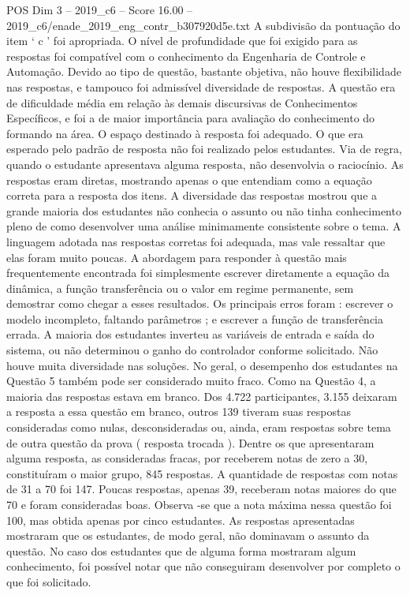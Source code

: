 \begin{textsample}{POS Dim 3 – 2019\_c6 – Score 16.00 – 2019\_c6/enade\_2019\_eng\_contr\_b307920d5e.txt}
A subdivisão da pontuação do item ‘ c ’ foi apropriada.
O nível de profundidade que foi exigido para as respostas foi compatível com o conhecimento da Engenharia de Controle e Automação.
Devido ao tipo de questão, bastante objetiva, não houve flexibilidade nas respostas, e tampouco foi admissível diversidade de respostas.
A questão era de dificuldade média em relação às demais discursivas de Conhecimentos Específicos, e foi a de maior importância para avaliação do conhecimento do formando na área.
O espaço destinado à resposta foi adequado.
O que era esperado pelo padrão de resposta não foi realizado pelos estudantes.
Via de regra, quando o estudante apresentava alguma resposta, não desenvolvia o raciocínio.
As respostas eram diretas, mostrando apenas o que entendiam como a equação correta para a resposta dos itens.
A diversidade das respostas mostrou que a grande maioria dos estudantes não conhecia o assunto ou não tinha conhecimento pleno de como desenvolver uma análise minimamente consistente sobre o tema.
A linguagem adotada nas respostas corretas foi adequada, mas vale ressaltar que elas foram muito poucas.
A abordagem para responder à questão mais frequentemente encontrada foi simplesmente escrever diretamente a equação da dinâmica, a função transferência ou o valor em regime permanente, sem demostrar como chegar a esses resultados.
Os principais erros foram : escrever o modelo incompleto, faltando parâmetros ; e escrever a função de transferência errada.
A maioria dos estudantes inverteu as variáveis de entrada e saída do sistema, ou não determinou o ganho do controlador conforme solicitado.
Não houve muita diversidade nas soluções.
No geral, o desempenho dos estudantes na Questão 5 também pode ser considerado muito fraco.
Como na Questão 4, a maioria das respostas estava em branco.
Dos 4.722 participantes, 3.155 deixaram a resposta a essa questão em branco, outros 139 tiveram suas respostas consideradas como nulas, desconsideradas ou, ainda, eram respostas sobre tema de outra questão da prova ( resposta trocada ).
Dentre os que apresentaram alguma resposta, as consideradas fracas, por receberem notas de zero a 30, constituíram o maior grupo, 845 respostas.
A quantidade de respostas com notas de 31 a 70 foi 147.
Poucas respostas, apenas 39, receberam notas maiores do que 70 e foram consideradas boas.
Observa -se que a nota máxima nessa questão foi 100, mas obtida apenas por cinco estudantes.
As respostas apresentadas mostraram que os estudantes, de modo geral, não dominavam o assunto da questão.
No caso dos estudantes que de alguma forma mostraram algum conhecimento, foi possível notar que não conseguiram desenvolver por completo o que foi solicitado.

\end{textsample}

